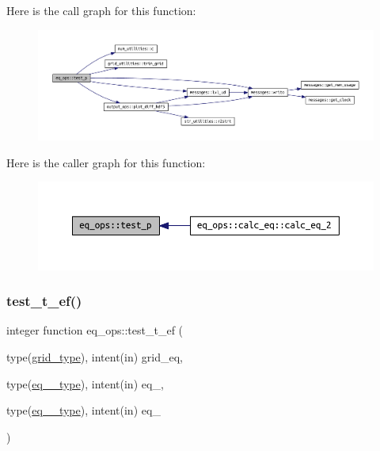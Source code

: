 Here is the call graph for this function\+:\nopagebreak
\begin{figure}[H]
\begin{center}
\leavevmode
\includegraphics[width=350pt]{namespaceeq__ops_a38b723f6ed5d2e2772c9c3ad14d5ffd4_cgraph}
\end{center}
\end{figure}
Here is the caller graph for this function\+:\nopagebreak
\begin{figure}[H]
\begin{center}
\leavevmode
\includegraphics[width=350pt]{namespaceeq__ops_a38b723f6ed5d2e2772c9c3ad14d5ffd4_icgraph}
\end{center}
\end{figure}
\mbox{\label{namespaceeq__ops_a1f5049c3e309fa23ee46fd116c9344f1}} 
\subsubsection{\texorpdfstring{test\+\_\+t\+\_\+ef()}{test\_t\_ef()}}
{\footnotesize\ttfamily integer function eq\+\_\+ops\+::test\+\_\+t\+\_\+ef (\begin{DoxyParamCaption}\item[{type(\hyperlink{structgrid__vars_1_1grid__type}{grid\+\_\+type}), intent(in)}]{grid\+\_\+eq,  }\item[{type(\hyperlink{structeq__vars_1_1eq__1__type}{eq\+\_\+1\+\_\+type}), intent(in)}]{eq\+\_,  }\item[{type(\hyperlink{structeq__vars_1_1eq__2__type}{eq\+\_\+2\+\_\+type}), intent(in)}]{eq\+\_ }\end{DoxyParamCaption})}



